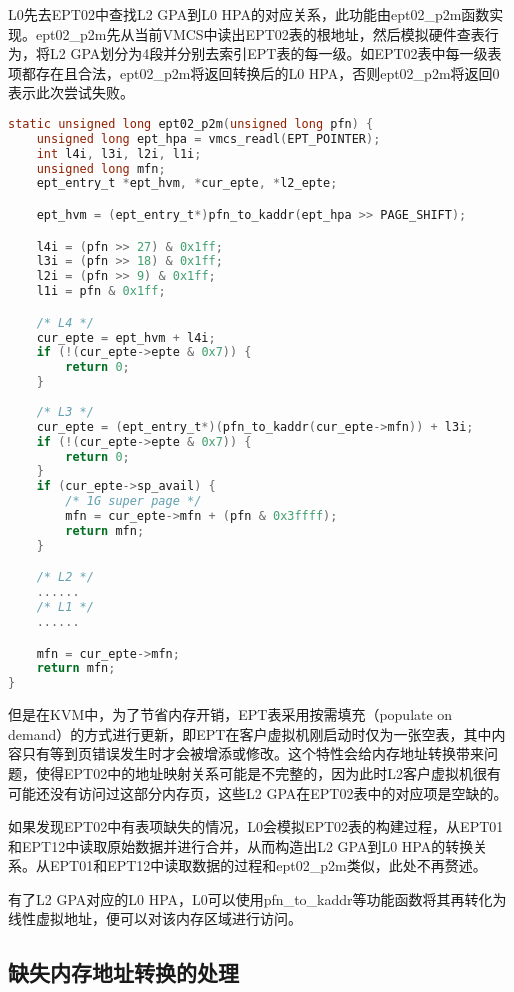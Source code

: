 L0先去EPT02中查找L2 GPA到L0 HPA的对应关系，此功能由ept02\_p2m函数实现。ept02\_p2m先从当前VMCS中读出EPT02表的根地址，然后模拟硬件查表行为，将L2 GPA划分为4段并分别去索引EPT表的每一级。如EPT02表中每一级表项都存在且合法，ept02\_p2m将返回转换后的L0 HPA，否则ept02\_p2m将返回0表示此次尝试失败。

\begin{lstlisting}[language={C}, caption={ept02\_p2m实现源代码}]
static unsigned long ept02_p2m(unsigned long pfn) {
    unsigned long ept_hpa = vmcs_readl(EPT_POINTER);
    int l4i, l3i, l2i, l1i;
    unsigned long mfn;
    ept_entry_t *ept_hvm, *cur_epte, *l2_epte;

    ept_hvm = (ept_entry_t*)pfn_to_kaddr(ept_hpa >> PAGE_SHIFT);

    l4i = (pfn >> 27) & 0x1ff;
    l3i = (pfn >> 18) & 0x1ff;
    l2i = (pfn >> 9) & 0x1ff;
    l1i = pfn & 0x1ff;

    /* L4 */
    cur_epte = ept_hvm + l4i;
    if (!(cur_epte->epte & 0x7)) {
        return 0;
    }
    
    /* L3 */
    cur_epte = (ept_entry_t*)(pfn_to_kaddr(cur_epte->mfn)) + l3i;
    if (!(cur_epte->epte & 0x7)) {
        return 0;
    }
    if (cur_epte->sp_avail) {
    	/* 1G super page */
        mfn = cur_epte->mfn + (pfn & 0x3ffff);
        return mfn;
    }

    /* L2 */
    ......
    /* L1 */
    ......

    mfn = cur_epte->mfn;
    return mfn;
}
\end{lstlisting}

但是在KVM中，为了节省内存开销，EPT表采用按需填充（populate on demand）的方式进行更新，即EPT在客户虚拟机刚启动时仅为一张空表，其中内容只有等到页错误发生时才会被增添或修改。这个特性会给内存地址转换带来问题，使得EPT02中的地址映射关系可能是不完整的，因为此时L2客户虚拟机很有可能还没有访问过这部分内存页，这些L2 GPA在EPT02表中的对应项是空缺的。

如果发现EPT02中有表项缺失的情况，L0会模拟EPT02表的构建过程，从EPT01和EPT12中读取原始数据并进行合并，从而构造出L2 GPA到L0 HPA的转换关系。从EPT01和EPT12中读取数据的过程和ept02\_p2m类似，此处不再赘述。

有了L2 GPA对应的L0 HPA，L0可以使用pfn\_to\_kaddr等功能函数将其再转化为线性虚拟地址，便可以对该内存区域进行访问。

\subsection{缺失内存地址转换的处理}

